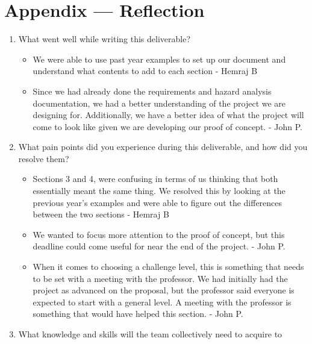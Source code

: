 \documentclass[12pt, titlepage]{article}
\begin{document}
\newpage{}
\section*{Appendix --- Reflection}



% 

\begin{enumerate}
  \item What went well while writing this deliverable? 
  \begin{itemize}
    \item We were able to use past year examples to set up our document and understand what contents to add to each section - Hemraj B
    \item Since we had already done the requirements and hazard analysis documentation, we had a better understanding of the project we are designing for. Additionally, we have a better idea of what the project will come to look like given we are developing our proof of concept. - John P.
  \end{itemize}
  \item What pain points did you experience during this deliverable, and how
    did you resolve them?
    \begin{itemize}
      \item Sections 3 and 4, were confusing in terms of us thinking that both essentially meant the same thing. We resolved this by looking at the previous year's examples and were able to figure out the differences between the two sections - Hemraj B
      \item We wanted to focus more attention to the proof of concept, but this deadline could come useful for near the end of the project. - John P.
      \item When it comes to choosing a challenge level, this is something that needs to be set with a meeting with the professor. We had initially had the project as advanced on the proposal, but the professor said everyone is expected to start with a general level. A meeting with the professor is something that would have helped this section. - John P.
    \end{itemize}
  \item What knowledge and skills will the team collectively need to acquire to

\end{enumerate}
\end{document}
